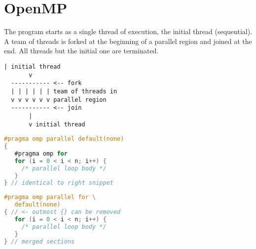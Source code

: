 \section*{OpenMP}
\begin{minipage}{0.5\linewidth}
  \flushleft
  The program starts as a single thread of execution, the initial thread (sequential).  A team of threads is forked at the beginning of a parallel region and joined at the end.  All threads but the initial one are terminated.
\end{minipage}
\begin{minipage}{0.5\linewidth}
\begin{lstlisting}[xleftmargin=1pt,xrightmargin=1pt]
       | initial thread
       v
  ----------- <-- fork
  | | | | | | team of threads in
  v v v v v v parallel region
  ----------- <-- join
       |
       v initial thread
\end{lstlisting}
\end{minipage}
\begin{minipage}{0.5\linewidth}
\begin{lstlisting}[language=C,xrightmargin=3pt]
#pragma omp parallel default(none)
{
   #pragma omp for
   for (i = 0 < i < n; i++) {
     /* parallel loop body */
   }
} // identical to right snippet
\end{lstlisting}
\end{minipage}
\begin{minipage}{0.5\linewidth}
\begin{lstlisting}[language=C,xleftmargin=3pt]
#pragma omp parallel for \
   default(none)
{ // <- outmost {} can be removed
   for (i = 0 < i < n; i++) {
     /* parallel loop body */
   }
} // merged sections
\end{lstlisting}
\end{minipage}

